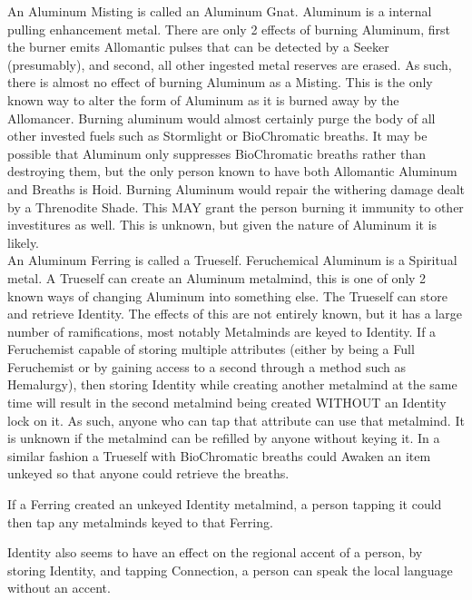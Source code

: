 \documentclass[conference]{IEEEtran}
\begin{document}
An Aluminum Misting is called an Aluminum Gnat.\cite{ARS}  Aluminum is a internal pulling enhancement metal.\cite{AL-TB}  There are only 2 effects of burning Aluminum, first the burner emits Allomantic pulses that can be detected by a Seeker (presumably),\cite{TFE-CH36} and second, all other ingested metal reserves are erased.\cite{ARS}  As such, there is almost no effect of burning Aluminum as a Misting.  This is the only known way to alter the form of Aluminum as it is burned away by the Allomancer.  Burning aluminum would almost certainly purge the body of all other invested fuels such as Stormlight or BioChromatic breaths.  It may be possible that Aluminum only suppresses BioChromatic breaths rather than destroying them, but the only person known to have both Allomantic Aluminum and Breaths is Hoid.\cite{SH-PT2-CH1}\cite{hoid-burn}\cite{WoR-CH45}\cite{WoR-CH59} Burning Aluminum would repair the withering damage dealt by a Threnodite Shade.\cite{gl-shade} This MAY grant the person burning it immunity to other investitures as well.  This is unknown, but given the nature of Aluminum it is likely.\\

An Aluminum Ferring is called a Trueself.\cite{ARS}  Feruchemical Aluminum is a Spiritual metal.\cite{FE-TB}  A Trueself can create an Aluminum metalmind, this is one of only 2 known ways of changing Aluminum into something else.  The Trueself can store and retrieve Identity.\cite{ARS}  The effects of this are not entirely known, but it has a large number of ramifications, most notably  Metalminds are keyed to Identity.  If a Feruchemist capable of storing multiple attributes (either by being a Full Feruchemist or by gaining access to a second through a method such as Hemalurgy), then storing Identity while creating another metalmind at the same time will result in the second metalmind being created WITHOUT an Identity lock on it.  As such, anyone who can tap that attribute can use that metalmind.\cite{BoM-CH3}  It is unknown if the metalmind can be refilled by anyone without keying it.  In a similar fashion a Trueself with BioChromatic breaths could Awaken an item unkeyed so that anyone could retrieve the breaths.\cite{unkeyed-awake}

If a Ferring created an unkeyed Identity metalmind, a person tapping it could then tap any metalminds keyed to that Ferring.\cite{HE-Fe-access}

Identity also seems to have an effect on the regional accent of a person\cite{identy-accent}, by storing Identity, and tapping Connection,\cite{OB-CH65}\cite{BoM-CH22} a person can speak the local language without an accent.\cite{identy-accent}\\
\end{document}
